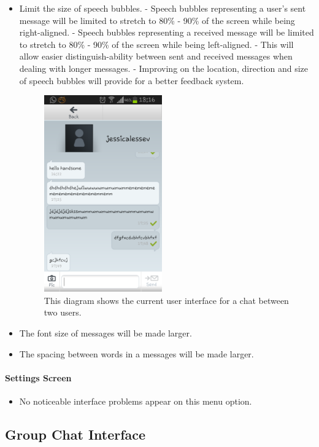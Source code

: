 \documentclass[11pt]{article}
\begin{document}
\begin{itemize}
\item	Limit the size of speech bubbles.
\subitem - Speech bubbles representing a user's sent message will be limited to stretch to 80\% - 90\% of the screen while being right-aligned.
\subitem	- Speech bubbles representing a received message will be limited to stretch to 80\% - 90\% of the screen while being left-aligned. 
\subitem	- This will allow easier distinguish-ability between sent and received messages when dealing with longer messages.
\subitem	- Improving on the location, direction and size of speech bubbles will provide for a better feedback system.
\begin{figure}[H]
\centering
\includegraphics[width=2in]{./images/screen.png}
\caption[Sample Chat Screen]{This diagram shows the current user interface for a chat between two users.}
\label{cd-chat-interface-2}
\end{figure}

\item	The font size of messages will be made larger.

\item	The spacing between words in a messages will be made larger.
\end{itemize}

\paragraph{Settings Screen}
\begin{itemize}
\item No noticeable interface problems appear on this menu option.
\end{itemize}

\subsection{Group Chat Interface}
\end{document}

